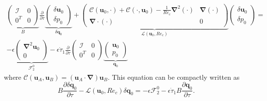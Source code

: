 \begin{equation}
  \begin{aligned}
  \underbrace{\begin{pmatrix} \mathcal{I} & 0 \\ 0^T & 0 \end{pmatrix}}_B
  \frac{\partial}{\partial \tau} \underbrace{\begin{pmatrix} \delta \bm{u}_0 \\ \delta p_0 \end{pmatrix}}_{\delta \bm{q}_0} +
  \underbrace{ \begin{pmatrix} \mathcal{C}( \bm{u}_0, \cdot ) + \mathcal{C}(\cdot,\bm{u}_0)-\frac{1}{Re_c} \bm{\nabla}^2(\cdot) & \bm{\nabla}(\cdot) \\
                     \bm{\nabla} \cdot ( \cdot )                                                                   &  0   \end{pmatrix}}_{\mathcal{L}(\bm{u}_0,Re_c)}
                     \begin{pmatrix} \delta \bm{u}_0 \\ \delta p_0 \end{pmatrix} = \\
                     - \epsilon \underbrace{ \begin{pmatrix} \bm{\nabla}^2 \bm{u}_0 \\ 0 \end{pmatrix} }_{\mathcal{F}_2^0}- 
                       \epsilon \dot{\tau}_1 \frac{\partial}{\partial \tau}  \begin{pmatrix} \mathcal{I} & 0 \\ 0^T & 0 \end{pmatrix}\underbrace{ \begin{pmatrix} \bm{u}_0 \\  p_0 \end{pmatrix} }_{\bm{q}_0}
  \end{aligned}
\end{equation}
%
where $\mathcal{C}(\bm{u}_A,\bm{u}_B) = \left( \bm{u}_A \cdot \bm{\nabla} \right) \bm{u}_B$. This equation can be compactly written as 
%
\begin{equation}
  B \frac{\partial \delta \bm{q}_0}{\partial \tau} - \mathcal{L}(\bm{u}_0,Re_c) \delta \bm{q}_0 = - \epsilon \mathcal{F}_2^0 - \epsilon \dot{\tau}_1 B \frac{\partial \bm{q}_0}{\partial \tau}.
\end{equation}
%
